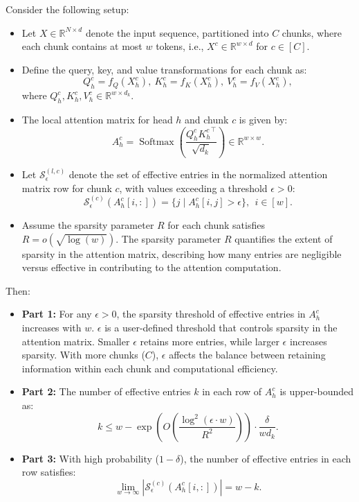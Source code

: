 \begin{theorem}\label{thm:parallel_attn_collapse_main}
    Consider the following setup:
    \begin{itemize}
        \item Let \( X \in \mathbb{R}^{N \times d} \) denote the input sequence, partitioned into \( C \) chunks, where each chunk contains at most \( w \) tokens, i.e., \( X^{c} \in \mathbb{R}^{w \times d} \) for \( c \in [C] \).
        \item Define the query, key, and value transformations for each chunk as:
        \[
        Q_h^{c} = f_Q(X_h^{c}), ~ K_h^{c} = f_K(X_h^{c}), ~V_h^{c} = f_V(X_h^{c}),
        \]
        where \( Q_h^{c}, K_h^{c}, V_h^{c} \in \mathbb{R}^{w \times d_k} \).
        \item The local attention matrix for head \( h \) and chunk \( c \) is given by:
        \[
        A_h^{c} = \operatorname{Softmax}\left(\frac{Q_h^{c} {K_h^{c}}^\top}{\sqrt{d_k}}\right) \in \mathbb{R}^{w \times w}.
        \]
        \item Let \( \mathcal{S}_\epsilon^{(l,c)} \) denote the set of effective entries in the normalized attention matrix row for chunk \( c \), with values exceeding a threshold \(\epsilon > 0\):
        \[
        \mathcal{S}_\epsilon^{(c)}(A_h^{c}[i,:]) = \{ j \mid A_h^{c}[i,j] > \epsilon \}, ~~ i \in [w].
        \]
        \item Assume the sparsity parameter \( R \) for each chunk satisfies \( R = o(\sqrt{\log(w)}) \). The sparsity parameter 
\(R\) quantifies the extent of sparsity in the attention matrix, describing how many entries are negligible versus effective in contributing to the attention computation. 
    \end{itemize}
    Then:
    \begin{itemize}
        \item {\bf Part 1:} For any \(\epsilon > 0\), the sparsity threshold of effective entries in \(A_h^{c}\) increases with \(w\). \( \epsilon \) is a user-defined threshold that controls sparsity in the attention matrix. Smaller \( \epsilon \) retains more entries, while larger \( \epsilon \) increases sparsity. With more chunks (\( C \)), \( \epsilon \) affects the balance between retaining information within each chunk and computational efficiency.
        \item {\bf Part 2:} The number of effective entries \(k\) in each row of \(A_h^{c}\) is upper-bounded as:
        \[
        k \leq w - \exp\left(O\left(\frac{\log^2(\epsilon \cdot w)}{R^2}\right)\right) \cdot \frac{\delta}{wd_k}.
        \]
        \item {\bf Part 3:} With high probability (\(1 - \delta\)), the number of effective entries in each row satisfies:
        \[
        \lim_{w \to \infty} | \mathcal{S}_\epsilon^{(c)}(A_h^{c}[i,:]) | = w - k.
        \]
    \end{itemize}
\end{theorem}